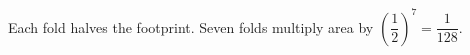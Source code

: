 Each fold halves the footprint. Seven folds multiply area by $(\dfrac{1}{2})^7=\boxed{\dfrac{1}{128}}$.
